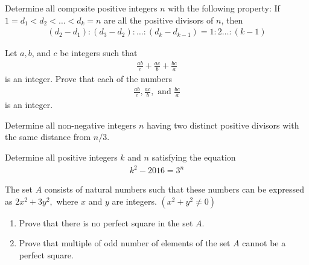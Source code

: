 \begin{problem}
	Determine all composite positive integers $n$ with the following property: If $1 = d_1 < d_2 <
	\dots < d_k = n$ are all the positive divisors of $n$, then
	\begin{align*}
		(d_2-d_1):(d_3-d_2):\dots : (d_k - d_{k-1}) = 1:2\dots :(k-1)
	\end{align*}
\end{problem}

\begin{problem}
	Let $a,b$, and $c$ be integers such that
	\begin{align*}
		\frac{ab}{c} + \frac{ac}{b} + \frac{bc}{a}
	\end{align*}
	is an integer. Prove that each of the numbers
	\begin{align*}
		\frac{ab}{c} , \frac{ac}{b}, \text{ and } \frac{bc}{a}
	\end{align*}
	is an integer.
\end{problem}

\begin{problem}
	Determine all non-negative integers $n$ having two distinct positive divisors with the same distance from $n/3$.
\end{problem}

\begin{problem}
	Determine all positive integers $k$ and $n$ satisfying the equation
	\begin{align*}
		k^2 - 2016 = 3^n
	\end{align*}
\end{problem}

\begin{problem}
	The set $A$ consists of natural numbers such that these numbers can be expressed as $2x^2+3y^2,$ where $x$ and $y$ are integers. $(x^2+y^2\not=0)$
	\begin{enumerate}
		\item Prove that there is no perfect square in the set $A.$
		\item Prove that multiple of odd number of elements of the set $A$ cannot be a perfect square.
	\end{enumerate}
\end{problem}

